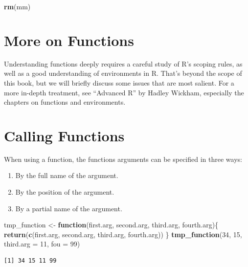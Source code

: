 \documentclass[
]{krantz}
\makeatletter
\newenvironment{Shaded}{\begin{snugshade}}{\end{snugshade}}
\newcommand{\ControlFlowTok}[1]{\textcolor[rgb]{0.27,0.27,0.27}{\textbf{#1}}}
\newcommand{\DataTypeTok}[1]{\textcolor[rgb]{0.27,0.27,0.27}{#1}}
\newcommand{\DecValTok}[1]{\textcolor[rgb]{0.06,0.06,0.06}{#1}}
\newcommand{\KeywordTok}[1]{\textcolor[rgb]{0.27,0.27,0.27}{\textbf{#1}}}
\newcommand{\NormalTok}[1]{#1}
\newcommand{\StringTok}[1]{\textcolor[rgb]{0.5,0.5,0.5}{#1}}
\providecommand{\tightlist}{%
  \setlength{\itemsep}{0pt}\setlength{\parskip}{0pt}}
\newenvironment{kframe}{%
\medskip{}
\setlength{\fboxsep}{.8em}
 \def\at@end@of@kframe{}%
 \ifinner\ifhmode%
  \def\at@end@of@kframe{\end{minipage}}%
  \begin{minipage}{\columnwidth}%
 \fi\fi%
 \def\FrameCommand##1{\hskip\@totalleftmargin \hskip-\fboxsep
 \colorbox{shadecolor}{##1}\hskip-\fboxsep
     \hskip-\linewidth \hskip-\@totalleftmargin \hskip\columnwidth}%
 \MakeFramed {\advance\hsize-\width
   \@totalleftmargin\z@ \linewidth\hsize
   \@setminipage}}%
 {\par\unskip\endMakeFramed%
 \at@end@of@kframe}
\renewenvironment{Shaded}{\begin{kframe}}{\end{kframe}}
\makeatother
\begin{document}
\begin{Shaded}
\begin{Highlighting}[]
\KeywordTok{rm}\NormalTok{(mm)}
\end{Highlighting}
\end{Shaded}

\hypertarget{more-on-functions}{%
\section{More on Functions}\label{more-on-functions}}

Understanding functions deeply requires a careful study of R's scoping rules, as well as a good understanding of environments in R. That's beyond the scope of this book, but we will briefly discuss some issues that are most salient. For a more in-depth treatment, see ``Advanced R'' by Hadley Wickham, especially the chapters on functions and environments.

\hypertarget{calling-functions}{%
\section{Calling Functions}\label{calling-functions}}

When using a function, the functions arguments can be specified in three ways:

\begin{enumerate}
\def\labelenumi{\arabic{enumi}.}
\tightlist
\item
  By the full name of the argument.
\item
  By the position of the argument.
\item
  By a partial name of the argument.
\end{enumerate}

\begin{Shaded}
\begin{Highlighting}[]
\NormalTok{tmp\_function \textless{}{-}}\StringTok{ }\ControlFlowTok{function}\NormalTok{(first.arg, second.arg, third.arg, fourth.arg)\{}
    \KeywordTok{return}\NormalTok{(}\KeywordTok{c}\NormalTok{(first.arg, second.arg, third.arg, fourth.arg))}
\NormalTok{\}}
\KeywordTok{tmp\_function}\NormalTok{(}\DecValTok{34}\NormalTok{, }\DecValTok{15}\NormalTok{, }\DataTypeTok{third.arg =} \DecValTok{11}\NormalTok{, }\DataTypeTok{fou =} \DecValTok{99}\NormalTok{)}
\end{Highlighting}
\end{Shaded}

\begin{verbatim}
[1] 34 15 11 99
\end{verbatim}
\end{document}
